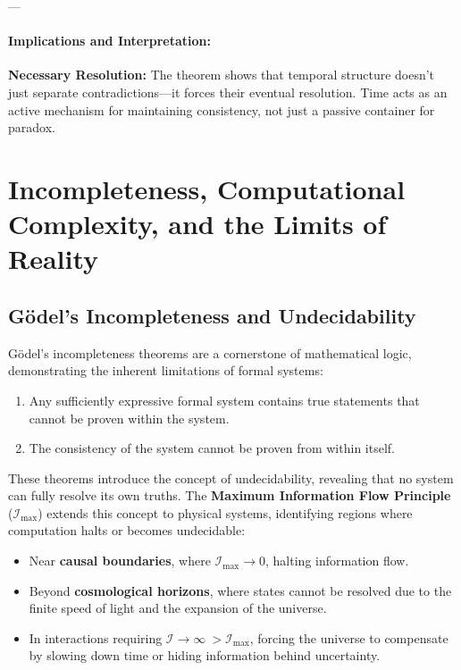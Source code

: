 \documentclass[12pt]{article}
\begin{document}
---

\paragraph{Implications and Interpretation:}
\textbf{Necessary Resolution:} The theorem shows that temporal structure doesn’t just separate contradictions—it forces their eventual resolution. Time acts as an active mechanism for maintaining consistency, not just a passive container for paradox.















\section{Incompleteness, Computational Complexity, and the Limits of Reality}

\subsection{Gödel’s Incompleteness and Undecidability}

Gödel’s incompleteness theorems are a cornerstone of mathematical logic, demonstrating the inherent limitations of formal systems:
\begin{enumerate}
    \item Any sufficiently expressive formal system contains true statements that cannot be proven within the system.
    \item The consistency of the system cannot be proven from within itself.
\end{enumerate}

These theorems introduce the concept of undecidability, revealing that no system can fully resolve its own truths. The \textbf{Maximum Information Flow Principle} (\(\mathcal{I}_{\text{max}}\)) extends this concept to physical systems, identifying regions where computation halts or becomes undecidable:
\begin{itemize}
    \item Near \textbf{causal boundaries}, where \(\mathcal{I}_{\text{max}} \to 0\), halting information flow.
    \item Beyond \textbf{cosmological horizons}, where states cannot be resolved due to the finite speed of light and the expansion of the universe.
    \item In interactions requiring \(\mathcal{I} \to \infty\ > \mathcal{I}_{\text{max}}\), forcing the universe to compensate by slowing down time or hiding information behind uncertainty.
\end{itemize}
\end{document}
